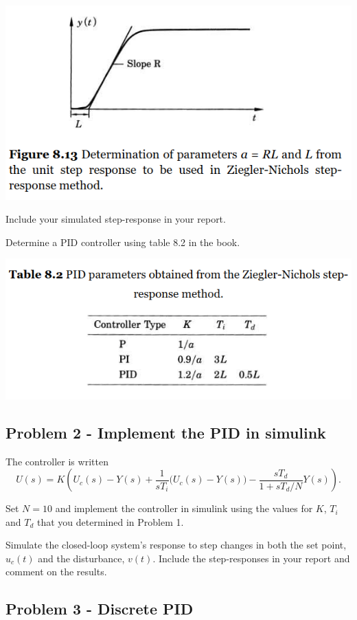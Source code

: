 \documentclass[a4paper]{scrartcl}
\begin{document}
\begin{center}
\includegraphics[width=0.7\linewidth]{../figures/fig8-13.png}
\end{center}

Include your simulated step-response in your report.

Determine a PID controller using table 8.2 in the book.

\begin{center}
\includegraphics[width=0.7\linewidth]{../figures/table8-2.png}
\end{center}

\subsection*{Problem 2 - Implement the PID in simulink}
\label{sec-2-2}

The controller is written
\[U(s) = K \left( U_c(s) - Y(s) + \frac{1}{sT_i}\big(U_c(s) - Y(s)\big) - \frac{sT_d}{1 + sT_d/N} Y(s)\right).\]

Set $N=10$ and implement the controller in simulink using the values for $K$, $T_i$ and $T_d$ that you determined in Problem 1.

Simulate the closed-loop system's response to step changes in both the set point, $u_c(t)$ and the disturbance, $v(t)$. Include the step-responses in your report and comment on the results.

\subsection*{Problem 3 - Discrete PID}
\label{sec-2-3}
\end{document}
